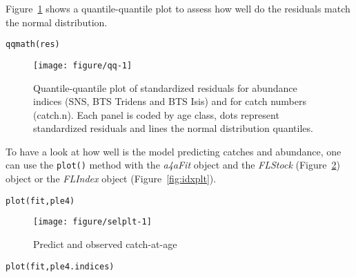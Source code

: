 \documentclass[a4paper,english,10pt]{article}\usepackage[]{graphicx}\usepackage[]{color}
\makeatletter
\def\maxwidth{ %
  \ifdim\Gin@nat@width>\linewidth
    \linewidth
  \else
    \Gin@nat@width
  \fi
}
\newcommand{\hlstd}[1]{\textcolor[rgb]{0,0,0}{#1}}%
\newcommand{\hlkwd}[1]{\textcolor[rgb]{0.361,0.506,0.596}{#1}}%
\newenvironment{kframe}{%
 \def\at@end@of@kframe{}%
 \ifinner\ifhmode%
  \def\at@end@of@kframe{\end{minipage}}%
  \begin{minipage}{\columnwidth}%
 \fi\fi%
 \def\FrameCommand##1{\hskip\@totalleftmargin \hskip-\fboxsep
 \colorbox{shadecolor}{##1}\hskip-\fboxsep
     \hskip-\linewidth \hskip-\@totalleftmargin \hskip\columnwidth}%
 \MakeFramed {\advance\hsize-\width
   \@totalleftmargin\z@ \linewidth\hsize
   \@setminipage}}%
 {\par\unskip\endMakeFramed%
 \at@end@of@kframe}
\newenvironment{knitrout}{}{} %
\newcommand{\code}[1]{{\texttt{#1}}}
\newcommand{\class}[1]{{\textit{#1}}}
\makeatother
\begin{document}
Figure~\ref{fig:qq} shows a quantile-quantile plot to assess how well do the residuals match the normal distribution.

\begin{knitrout}
\color{fgcolor}\begin{kframe}
\begin{alltt}
\hlkwd{qqmath}\hlstd{(res)}
\end{alltt}
\end{kframe}\begin{figure}[H]

{\centering \texttt{[image: figure/qq-1]} 

}

\caption[Quantile-quantile plot of standardized residuals for abundance indices (SNS, BTS Tridens and BTS Isis) and for catch numbers (catch]{Quantile-quantile plot of standardized residuals for abundance indices (SNS, BTS Tridens and BTS Isis) and for catch numbers (catch.n). Each panel is coded by age class, dots represent standardized residuals and lines the normal distribution quantiles.}\label{fig:qq}
\end{figure}


\end{knitrout}

To have a look at how well is the model predicting catches and abundance, one can use the \code{plot()} method with the \class{a4aFit} object and the \class{FLStock} (Figure~\ref{fig:selplt}) object or the \class{FLIndex} object (Figure~\ref{fig:idxplt}).

\begin{knitrout}
\color{fgcolor}\begin{kframe}
\begin{alltt}
\hlkwd{plot}\hlstd{(fit, ple4)}
\end{alltt}
\end{kframe}\begin{figure}[H]

{\centering \texttt{[image: figure/selplt-1]} 

}

\caption[Predict and observed catch-at-age]{Predict and observed catch-at-age}\label{fig:selplt}
\end{figure}


\end{knitrout}

\begin{knitrout}
\color{fgcolor}\begin{kframe}
\begin{alltt}
\hlkwd{plot}\hlstd{(fit, ple4.indices)}
\end{alltt}
\end{kframe}
\end{knitrout}
\end{document}
